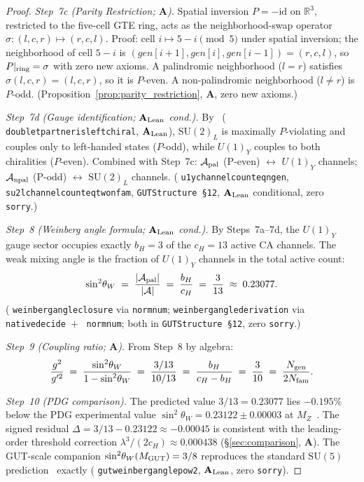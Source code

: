 \documentclass[11pt]{article}
\theoremstyle{remark}
\newcommand{\Ngen}{N_{\rm gen}}
\newcommand{\Nfam}{N_{\rm fam}}
\newcommand{\bH}{b_H}
\newcommand{\cH}{c_H}
\newcommand{\lean}[1]{%
  \penalty-100
  \begingroup\def\_{\textunderscore\allowbreak}\texttt{#1}\endgroup}
\newcommand{\sinwsq}{\sin^2\!\theta_W}
\newcommand{\CatA}{\textbf{A}}
\newcommand{\CatAL}{\ensuremath{\textbf{A}_{\rm Lean}}}
\begin{document}
\begin{proof}
\medskip
\textit{Step~7c (Parity Restriction; $\CatA$).}
Spatial inversion $P = -\mathrm{id}$ on $\mathbb{R}^3$, restricted to the five-cell
GTE ring, acts as the neighborhood-swap operator
$\sigma: (l,c,r) \mapsto (r,c,l)$.
Proof: cell $i \mapsto 5 - i \pmod 5$ under spatial inversion; the neighborhood of
cell $5-i$ is $(gen[i+1], gen[i], gen[i-1]) = (r,c,l)$, so $P|_{\rm ring} = \sigma$
with zero new axioms.
A palindromic neighborhood ($l = r$) satisfies $\sigma(l,c,r) = (l,c,r)$, so it is
$P$-even.
A non-palindromic neighborhood ($l \neq r$) is $P$-odd.
(Proposition~\ref{prop:parity_restriction}, $\CatA$, zero new axioms.)

\medskip
\textit{Step~7d (Gauge identification; $\CatAL$ cond.).}
By~\cite{Spivack2026_UGPDynamics} (\lean{doublet\_partner\_is\_left\_chiral}, $\CatAL$),
$\mathrm{SU}(2)_L$ is maximally $P$-violating and couples only to left-handed states
($P$-odd), while $U(1)_Y$ couples to both chiralities ($P$-even).
Combined with Step~7c:
$\mathcal{A}_{\rm pal}$ (P-even) $\leftrightarrow$ $U(1)_Y$ channels;
$\mathcal{A}_{\rm npal}$ (P-odd) $\leftrightarrow$ $\mathrm{SU}(2)_L$ channels.
(\lean{u1y\_channel\_count\_eq\_ngen}, \lean{su2l\_channel\_count\allowbreak\_eq\_two\_nfam},
\texttt{GUTStructure~\S12}, $\CatAL$ conditional, zero \texttt{sorry}.)

\medskip
\textit{Step~8 (Weinberg angle formula; $\CatAL$ cond.).}
By Steps~7a--7d, the $U(1)_Y$ gauge sector occupies exactly $\bH = 3$ of the
$\cH = 13$ active CA channels.
The weak mixing angle is the fraction of $U(1)_Y$ channels in the total active
count:
\[
  \sinwsq \;=\; \frac{|\mathcal{A}_{\rm pal}|}{|\mathcal{A}|}
  \;=\; \frac{\bH}{\cH}
  \;=\; \frac{3}{13} \;\approx\; 0.23077.
\]
(\lean{weinberg\_angle\_closure} via \lean{norm\_num};\;
\lean{weinberg\_angle\_derivation} via \lean{native\_decide}~$+$~\lean{norm\_num};
both in \texttt{GUTStructure~\S12}, zero \texttt{sorry}.)

\medskip
\textit{Step~9 (Coupling ratio; $\CatA$).}
From Step~8 by algebra:
\[
  \frac{g^2}{g'^2} \;=\; \frac{\sinwsq}{1 - \sinwsq}
  \;=\; \frac{3/13}{10/13}
  \;=\; \frac{\bH}{\cH - \bH}
  \;=\; \frac{3}{10}
  \;=\; \frac{\Ngen}{2\Nfam}.
\]

\medskip
\textit{Step~10 (PDG comparison).}
The predicted value $3/13 = 0.23077$ lies $-0.195\%$ below the PDG experimental
value $\sinwsq = 0.23122 \pm 0.00003$ at $M_Z$~\cite{ParticleDataGroup2022}.
The signed residual
$\Delta = 3/13 - 0.23122 \approx -0.00045$
is consistent with the leading-order threshold correction
$\lambda^3/(2\cH) \approx 0.000438$ (\S\ref{sec:comparison}, $\CatA$).
The GUT-scale companion $\sinwsq(M_{\rm GUT}) = 3/8$ reproduces the standard
$\mathrm{SU}(5)$ prediction~\cite{GeorgiGlashow1974} exactly
(\lean{gut\_weinberg\_angle\_pow2}, $\CatAL$, zero \texttt{sorry}).
\end{proof}
\end{document}
